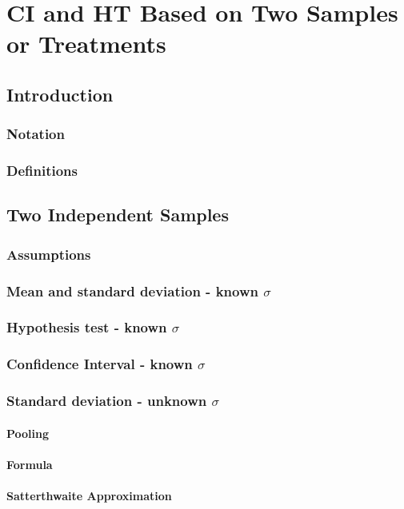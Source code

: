 \chapter{CI and HT Based on Two Samples or Treatments}  %

\section{Introduction}  %
\subsection{Notation}  %
\subsection{Definitions}  %

\section{Two Independent Samples}  %
\subsection{Assumptions}  %
\subsection{Mean and standard deviation - known $\sigma$}  %
\subsection{Hypothesis test - known $\sigma$}  %
\subsection{Confidence Interval - known $\sigma$}  %
\subsection{Standard deviation - unknown $\sigma$}  %
\subsubsection{Pooling}  %
\subsubsection{Formula}  %
\subsubsection{Satterthwaite Approximation}  %

